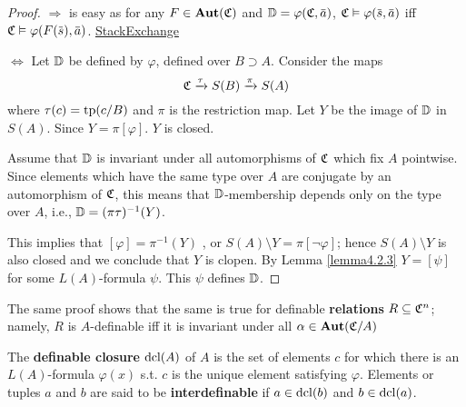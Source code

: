 \documentclass[11pt]{article}
\begin{document}
\begin{proof}
\(\Rightarrow\) is easy as for any \(F\in\operatorname{\textbf{Aut}}(\mathfrak{C})\) and \(\D=\varphi(\fC,\bara)\), \(\fC\vDash\varphi(\bars,\bara)\)
iff \(\fC\vDash\varphi(F(\bars),\bara)\). \href{https://math.stackexchange.com/questions/3361635/when-are-automorphism-invariant-subsets-definable}{StackExchange}

\(\Leftrightarrow\) Let \(\mathbb{D}\) be defined by \(\varphi\), defined over \(B\supset A\). Consider the maps
\begin{equation*}
\mathfrak{C}\xrightarrow{\tau}S(B)\xrightarrow{\pi}S(A)
\end{equation*}
where \(\tau(c)=\operatorname{tp}(c/B)\) and \(\pi\) is the restriction map. Let \(Y\) be the image of \(\mathbb{D}\)
in \(S(A)\). Since \(Y=\pi[\varphi]\). \(Y\) is closed.


Assume that \(\mathbb{D}\) is invariant under all automorphisms of \(\mathfrak{C}\) which fix \(A\) pointwise. Since
elements which have the same type over \(A\) are conjugate by an automorphism of \(\mathfrak{C}\), this
means that \(\mathbb{D}\)-membership depends only on the type over \(A\), i.e., \(\mathbb{D}=(\pi\tau)^{-1}(Y)\).

This implies that \([\varphi]=\pi^{-1}(Y)\)
, or \(S(A)\setminus Y=\pi[\neg\varphi]\); hence \(S(A)\setminus Y\) is also closed and
we conclude that \(Y\) is clopen. By Lemma \ref{lemma4.2.3} \(Y=[\psi]\) for some \(L(A)\)-formula \(\psi\).
This \(\psi\) defines \(\mathbb{D}\).
\end{proof}

The same proof shows that the same is true for definable \textbf{relations} \(R\subseteq\mathfrak{C}^n\); namely, \(R\)
is \(A\)-definable iff it is invariant under all \(\alpha\in\operatorname{\textbf{Aut}}(\mathfrak{C}/A)\)

\begin{definition}[]
The \textbf{definable closure} \(\operatorname{dcl}(A)\) of \(A\) is the set of elements \(c\) for which there is
an \(L(A)\)-formula \(\varphi(x)\) s.t. \(c\) is the unique element satisfying \(\varphi\). Elements or
tuples \(a\) and \(b\) are said to be \textbf{interdefinable} if \(a\in\operatorname{dcl}(b)\) and \(b\in\operatorname{dcl}(a)\).
\end{definition}
\end{document}
